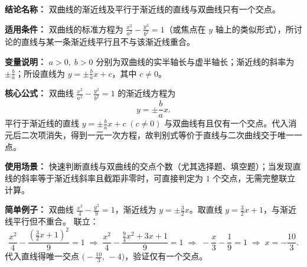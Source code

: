 \textbf{结论名称：} 双曲线的渐近线及平行于渐近线的直线与双曲线只有一个交点。

\textbf{适用条件：} 双曲线的标准方程为 \(\frac{x^2}{a^2}-\frac{y^2}{b^2}=1\)（或焦点在 \(y\) 轴上的类似形式），所讨论的直线与某一条渐近线平行且不与该渐近线重合。

\textbf{变量说明：} \(a>0,\;b>0\) 分别为双曲线的实半轴长与虚半轴长；渐近线的斜率为 \(\pm\frac{b}{a}\)；所设直线为 \(y=\pm\frac{b}{a}x+c\)，其中 \(c\neq0\)。

\textbf{核心公式：} 双曲线 \(\frac{x^2}{a^2}-\frac{y^2}{b^2}=1\) 的渐近线方程为
\[ y=\pm\frac{b}{a}x. \]
平行于渐近线的直线 \(\boxed{y=\pm\frac{b}{a}x+c\;(c\neq0)}\) 与双曲线有且仅有一个交点。代入消元后二次项消失，得到一元一次方程，故判别式等价于直线与二次曲线交于唯一一点。

\textbf{使用场景：} 快速判断直线与双曲线的交点个数（尤其选择题、填空题）；当发现直线的斜率等于渐近线斜率且截距非零时，可直接判定为 \(1\) 个交点，无需完整联立计算。

\textbf{简单例子：} 双曲线 \(\frac{x^2}{4}-\frac{y^2}{9}=1\)，渐近线为 \(y=\pm\frac{3}{2}x\)。取直线 \(y=\frac{3}{2}x+1\)，与渐近线平行但不重合。
联立：
\[ \frac{x^2}{4}-\frac{(\frac{3}{2}x+1)^2}{9}=1 \;\Longrightarrow\; \frac{x^2}{4}-\frac{\frac{9}{4}x^2+3x+1}{9}=1 \;\Longrightarrow\; -\frac{x}{3}-\frac{1}{9}=1 \;\Longrightarrow\; x=-\frac{10}{3}. \]
代入直线得唯一交点 \(\bigl(-\frac{10}{3},\,-4\bigr)\)，验证仅有一个交点。